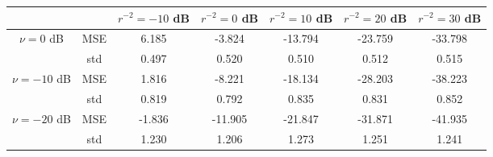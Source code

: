 \begin{tabular}{ccccccc}
\toprule
             &     &  $r^{-2}=-10$ dB &  $r^{-2}=0$ dB &  $r^{-2}=10$ dB &  $r^{-2}=20$ dB &  $r^{-2}=30$ dB \\
\midrule
$\nu=0$ dB & MSE &            6.185 &         -3.824 &         -13.794 &         -23.759 &         -33.798 \\
             & std &            0.497 &          0.520 &           0.510 &           0.512 &           0.515 \\ \hline
$\nu=-10$ dB & MSE &            1.816 &         -8.221 &         -18.134 &         -28.203 &         -38.223 \\
             & std &            0.819 &          0.792 &           0.835 &           0.831 &           0.852 \\ \hline
$\nu=-20$ dB & MSE &           -1.836 &        -11.905 &         -21.847 &         -31.871 &         -41.935 \\
             & std &            1.230 &          1.206 &           1.273 &           1.251 &           1.241 \\
\bottomrule
\end{tabular}
